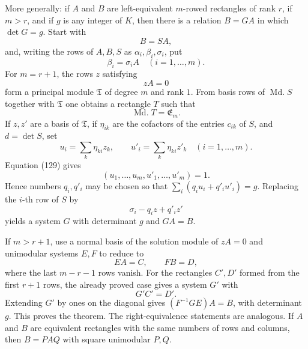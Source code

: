 \documentclass[11pt]{article}
\newcommand{\Md}{\operatorname{Md.}}
\begin{document}
More generally: if $A$ and $B$ are left-equivalent $m$-rowed rectangles of rank $r$, if $m>r$, and if $g$ is any integer of $K$, then there is a relation $B=GA$ in which $\det G=g$. Start with
\begin{equation}
  B=SA,
\tag{126}
\end{equation}
and, writing the rows of $A,B,S$ as $\alpha_i,\beta_i,\sigma_i$, put
\begin{equation}
  \beta_i=\sigma_iA\quad (i=1,
\ldots,m).
\tag{127}
\end{equation}
For $m=r+1$, the rows $z$ satisfying
\begin{equation}
  zA=0
\tag{128}
\end{equation}
form a principal module $\mathfrak T$ of degree $m$ and rank $1$. From basis rows of $\Md S$ together with $\mathfrak T$ one obtains a rectangle $T$ such that
\begin{equation}
  \Md T=\mathfrak E_m.
\tag{129}
\end{equation}
If $z,z'$ are a basis of $\mathfrak T$, if $\eta_{ik}$ are the cofactors of the entries $c_{ik}$ of $S$, and $d=\det S$, set
\begin{equation}
  u_i=\sum_k\eta_{ki}z_k,
  \qquad
  u'_i=\sum_k\eta_{ki}z'_k
  \quad (i=1,
\ldots,m).
\tag{130}
\end{equation}
Equation (129) gives
\begin{equation}
  (u_1,
\ldots,u_m,u'_1,
\ldots,u'_m)=1.
\tag{131}
\end{equation}
Hence numbers $q_i,q'_i$ may be chosen so that $\sum_i(q_i u_i+q'_i u'_i)=g$. Replacing the $i$-th row of $S$ by
\[
  \sigma_i-q_i z+q'_i z'
\]
yields a system $G$ with determinant $g$ and $GA=B$.

If $m>r+1$, use a normal basis of the solution module of $zA=0$ and unimodular systems $E,F$ to reduce to
\begin{equation}
  EA=C,
  \qquad
  FB=D,
\tag{132}
\end{equation}
where the last $m-r-1$ rows vanish. For the rectangles $C',D'$ formed from the first $r+1$ rows, the already proved case gives a system $G'$ with
\begin{equation}
  G'C'=D'.
\tag{133}
\end{equation}
Extending $G'$ by ones on the diagonal gives $(F^{-1}GE)A=B$, with determinant $g$. This proves the theorem. The right-equivalence statements are analogous. If $A$ and $B$ are equivalent rectangles with the same numbers of rows and columns, then $B=PAQ$ with square unimodular $P,Q$.
\end{document}
